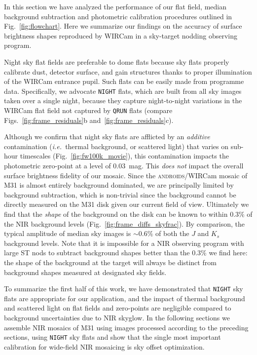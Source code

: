 \documentclass[iop,tighten]{emulateapj}
\newcommand{\ie}{\textit{i.e.~}}
\newcommand{\androids}{\textsc{androids}}
\newcommand{\Fig}[1]{Fig.~\ref{fig:#1}}  %
\begin{document}
In this section we have analyzed the performance of our flat field, median background subtraction and photometric calibration procedures outlined in \Fig{flowchart}.
Here we summarize our findings on the accuracy of surface brightness shapes reproduced by WIRCam in a sky-target nodding observing program.

Night sky flat fields are preferable to dome flats because sky flats properly calibrate dust, detector surface, and gain structures thanks to proper illumination of the WIRCam entrance pupil.
Such flats can be easily made from programme data.
Specifically, we advocate \texttt{NIGHT} flats, which are built from all sky images taken over a single night, because they capture night-to-night variations in the WIRCam flat field not captured by \texttt{QRUN} flats (compare Figs.~\ref{fig:frame_residuals}b and~\ref{fig:frame_residuals}c).

Although we confirm that night sky flats are afflicted by an \emph{additive} contamination (\ie thermal background, or scattered light) that varies on sub-hour timescales (\Fig{fw100k_movie}), this contamination impacts the photometric zero-point at a level of $0.03$~mag. 
This \emph{does not} impact the overall surface brightness fidelity of our mosaic.
Since the \androids /WIRCam mosaic of M31 is almost entirely background dominated, we are principally limited by background subtraction, which is non-trivial since the background cannot be directly measured on the M31 disk given our current field of view.
Ultimately we find that the \emph{shape} of the background on the disk can be known to within 0.3\% of the NIR background levels (\Fig{frame_diffs_skyfrac}).
By comparison, the typical amplitude of median sky images is $\sim 0.6\%$ of both the $J$ and $K_s$ background levels.
Note that it is impossible for a NIR observing program with large ST nods to subtract background shapes better than the 0.3\% we find here: the shape of the background at the target will always be distinct from background shapes measured at designated sky fields.

To summarize the first half of this work, we have demonstrated that \texttt{NIGHT} sky flats are appropriate for our application, and the impact of thermal background and scattered light on flat fields and zero-points are negligible compared to background uncertainties due to NIR skyglow.
In the following sections we assemble NIR mosaics of M31 using images processed according to the preceding sections, using \texttt{NIGHT} sky flats and show that the single most important calibration for wide-field NIR mosaicing is sky offset optimization.
\end{document}
